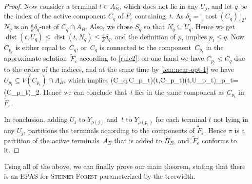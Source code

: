 \documentclass[a4paper]{article}
\theoremstyle{plain}
\newcommand{\eps}{{\varepsilon}}
\def\[#1\]{\begin{doitall}#1\end{doitall}}
\newcommand{\pname}[1]{\textsc{#1}}
\DeclareMathOperator{\cost}{cost}
\DeclareMathOperator{\dist}{dist}
\newcommand{\SF}{\pname{Steiner Forest}\xspace}
\newcommand{\pow}[1]{\lfloor #1\rfloor_{2}}
\begin{document}
\begin{proof}
Now consider a terminal $t\in A_B$, which does not lie in any $U_j$, and let $q$ be the index of the active 
component $C_q$ of $F_\eps$ containing~$t$. As $\delta_q=\pow{\cost(C_q)}$, $N_q$ is an $\frac{\eps}{k}\delta_q$-net of 
$C_q\cap A_B$. Also, we chose $S_q$ so that $N_q\subseteq U_q$. Hence we get 
$\dist(t,U_q)\leq\dist(t,N_q)\leq\frac{\eps}{k}\delta_q$, and the definition of $p_t$ implies $p_t\leq q$.
Now~$C_{p_t}$ is either equal to~$C_q$, or~$C_q$ is connected to the component~$C_{p_t}$ in the approximate solution~$\widetilde{F}_\eps$
according to \autoref{rule2}: on one hand we have $C_{p_t}\leq C_q$ due to the order of the indices, and at the same time by 
\autoref{lem:near-opt-1} we have $U_{p_t}\subseteq V(C_{p_t})\cap A_B$, which implies
\[
\dist(C_q,C_{p_t})\leq\dist(t,C_{p_t})\leq\dist(t,U_{p_t})\leq\frac{\eps}{k}\delta_{p_t}=\frac{\eps}{k}\pow{\cost(C_{p_t})}.
\]
Hence we can conclude that~$t$ lies in the same component as $C_{p_t}$ in $\widetilde{F}_\eps$. 

In conclusion, adding $U_j$ to $Y_{\rho(j)}$ and~$t$ to $Y_{\rho(p_t)}$ for each terminal $t$ not lying in any $U_j$, 
partitions the terminals according to the components of $\widetilde{F}_\eps$.
Hence $\pi$ is a partition of the active terminals~$A_B$ that is added to $\Pi_B$, and~$\widetilde{F}_\eps$ conforms to it.
\end{proof}

Using all of the above, we can finally prove our main theorem, stating that there is an EPAS for \SF parameterized by the treewidth.
\end{document}

